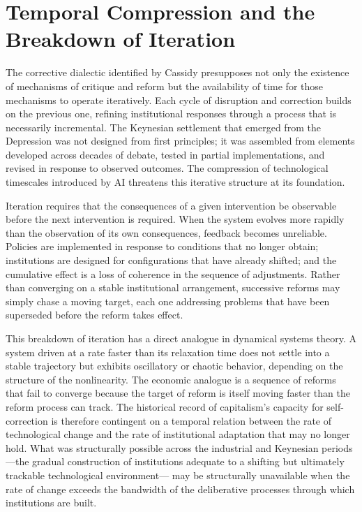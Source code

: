 \documentclass[11pt, a4paper]{article}
\theoremstyle{plain}
\theoremstyle{definition}
\begin{document}
\section{Temporal Compression and the Breakdown of Iteration}

The corrective dialectic identified by Cassidy presupposes not only the
existence of mechanisms of critique and reform but the availability of time
for those mechanisms to operate iteratively. Each cycle of disruption and
correction builds on the previous one, refining institutional responses
through a process that is necessarily incremental. The Keynesian settlement
that emerged from the Depression was not designed from first principles; it
was assembled from elements developed across decades of debate, tested in
partial implementations, and revised in response to observed outcomes. The
compression of technological timescales introduced by AI threatens this
iterative structure at its foundation.

Iteration requires that the consequences of a given intervention be observable
before the next intervention is required. When the system evolves more rapidly
than the observation of its own consequences, feedback becomes unreliable.
Policies are implemented in response to conditions that no longer obtain;
institutions are designed for configurations that have already shifted; and
the cumulative effect is a loss of coherence in the sequence of adjustments.
Rather than converging on a stable institutional arrangement, successive
reforms may simply chase a moving target, each one addressing problems that
have been superseded before the reform takes effect.

This breakdown of iteration has a direct analogue in dynamical systems theory.
A system driven at a rate faster than its relaxation time does not settle into
a stable trajectory but exhibits oscillatory or chaotic behavior, depending on
the structure of the nonlinearity. The economic analogue is a sequence of
reforms that fail to converge because the target of reform is itself moving
faster than the reform process can track. The historical record of capitalism's
capacity for self-correction is therefore contingent on a temporal relation
between the rate of technological change and the rate of institutional
adaptation that may no longer hold. What was structurally possible across the
industrial and Keynesian periods---the gradual construction of institutions
adequate to a shifting but ultimately trackable technological environment---
may be structurally unavailable when the rate of change exceeds the bandwidth
of the deliberative processes through which institutions are built.
\end{document}
